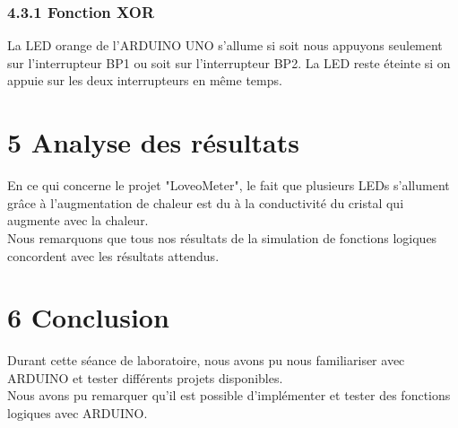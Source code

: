 \documentclass{report}
\begin{document}
\subsubsection*{4.3.1 Fonction XOR}
La LED orange de l'ARDUINO UNO s'allume si soit nous appuyons seulement sur l'interrupteur BP1 ou soit sur l'interrupteur BP2. La LED reste éteinte si on appuie sur les deux interrupteurs en même temps.

\section*{5 Analyse des r\'esultats}
En ce qui concerne le projet "LoveoMeter", le fait que plusieurs LEDs s'allument grâce à l'augmentation de chaleur est du à la conductivité du cristal qui augmente avec la chaleur.\\
Nous remarquons que  tous nos résultats de la simulation de fonctions logiques concordent avec les résultats attendus.

\section*{6 Conclusion}

Durant cette s\'eance de laboratoire, nous avons pu nous familiariser avec ARDUINO et tester différents projets disponibles.\\
Nous avons pu remarquer qu'il est possible d'implémenter et tester des fonctions logiques avec ARDUINO.
\end{document}
